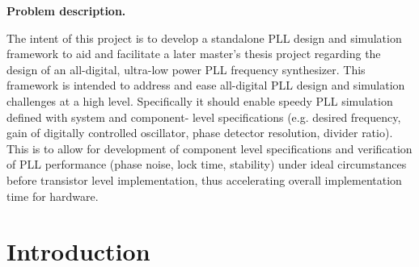 	\pagebreak
	\thispagestyle{nohdr}
	\null\pagebreak
	\thispagestyle{nohdr}
	\Huge\textbf{Problem description.}\\
	\vspace{1em}
	\large\fontfamily{\rmdefault}\selectfont 
	
	The intent of this project is to develop a standalone PLL design and simulation framework to aid and facilitate a later master's thesis project regarding the design of an all-digital, ultra-low power PLL frequency synthesizer. This framework is intended to address and ease all-digital PLL design and simulation challenges at a high level. Specifically it should enable speedy PLL simulation defined with system and component- level specifications (e.g. desired frequency, gain of digitally controlled oscillator, phase detector resolution, divider ratio). This is to allow for development of component level specifications and verification of PLL performance (phase noise, lock time, stability) under ideal circumstances before transistor level implementation, thus accelerating overall implementation time for hardware.


	\fontfamily{\sfdefault}\selectfont 
	\thispagestyle{nohdr}
	\null\pagebreak
	\thispagestyle{nohdr}
	\null\pagebreak
	\tableofcontents
	\pagebreak
	\listoffigures
	\listoftables


	\fontfamily{\rmdefault}\selectfont 
	

	\pagebreak
	\FloatBarrier

	\section{Introduction}\label{intro}
	
	\pagebreak
	\FloatBarrier

